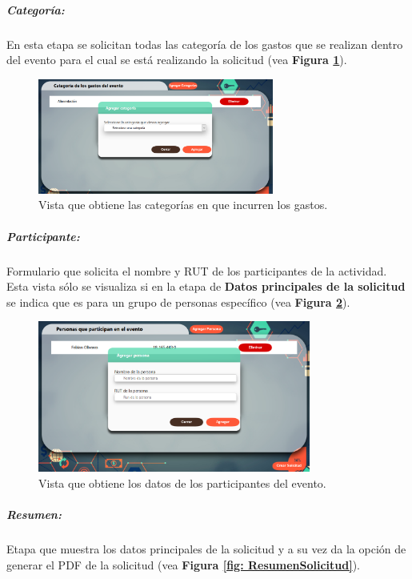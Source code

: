     \subparagraph{\emph{Categoría: }} En esta etapa se solicitan todas las categoría de los gastos que se realizan dentro del evento para el cual se está realizando la solicitud (vea \textbf{Figura \ref{fig: Categorias}}).

    \begin{figure}[h]
        \centering
        \includegraphics[width= 0.69\textwidth]{Imagenes/Categoria.PNG}
        \caption{\label{fig: Categorias}Vista que obtiene las categorías en que incurren los gastos.}
    \end{figure}

    \subparagraph{\emph{Participante: }} Formulario que solicita el nombre y RUT de los participantes de la actividad. Esta vista sólo se visualiza si en la etapa de \textbf{Datos principales de la solicitud} se indica que es para un grupo de personas específico (vea \textbf{Figura \ref{fig: Personas}}). 

    \begin{figure}[h]
        \centering
        \includegraphics[width= 0.8\textwidth]{Imagenes/AgregarPersonas.PNG}
        \caption{\label{fig: Personas}Vista que obtiene los datos de los participantes del evento.}
    \end{figure}

    \subparagraph{\emph{Resumen: }} Etapa que muestra los datos principales de la solicitud y a su vez da la opción de generar el PDF de la solicitud (vea \textbf{Figura \ref{fig: ResumenSolicitud}}).

